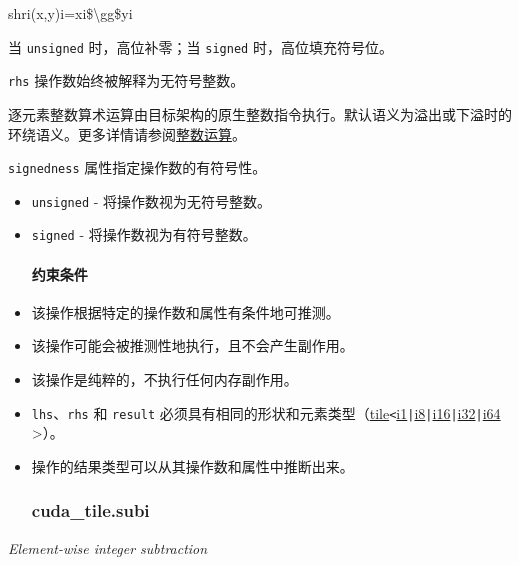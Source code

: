 \documentclass{article}
\begin{document}
shri(x,y)i=xi\$\textbackslash{}gg\$yi


当 \texttt{unsigned} 时，高位补零；当 \texttt{signed} 时，高位填充符号位。



\texttt{rhs} 操作数始终被解释为无符号整数。



逐元素整数算术运算由目标架构的原生整数指令执行。默认语义为溢出或下溢时的环绕语义。更多详情请参阅\href{https://docs.nvidia.com/cuda/tile-ir/latest/sections/operations.html#op-group-integer}{整数运算}。



\texttt{signedness} 属性指定操作数的有符号性。



\begin{itemize}
\item \texttt{unsigned} - 将操作数视为无符号整数。
\item \texttt{signed} - 将操作数视为有符号整数。




\paragraph{约束条件}


\item 该操作根据特定的操作数和属性有条件地可推测。
\item 该操作可能会被推测性地执行，且不会产生副作用。
\item 该操作是纯粹的，不执行任何内存副作用。
\item \texttt{lhs}、\texttt{rhs} 和 \texttt{result} 必须具有相同的形状和元素类型（\href{https://docs.nvidia.com/cuda/tile-ir/latest/sections/types.html#type-tile}{tile}\texttt{<}\href{https://docs.nvidia.com/cuda/tile-ir/latest/sections/types.html#subsection-element-types}{i1}\texttt{|}\href{https://docs.nvidia.com/cuda/tile-ir/latest/sections/types.html#subsection-element-types}{i8}\texttt{|}\href{https://docs.nvidia.com/cuda/tile-ir/latest/sections/types.html#subsection-element-types}{i16}\texttt{|}\href{https://docs.nvidia.com/cuda/tile-ir/latest/sections/types.html#subsection-element-types}{i32}\texttt{|}\href{https://docs.nvidia.com/cuda/tile-ir/latest/sections/types.html#subsection-element-types}{i64} >）。
\item 操作的结果类型可以从其操作数和属性中推断出来。




\subsubsection{cuda\_tile.subi}


\end{itemize}
\textit{Element-wise integer subtraction}
\end{document}
